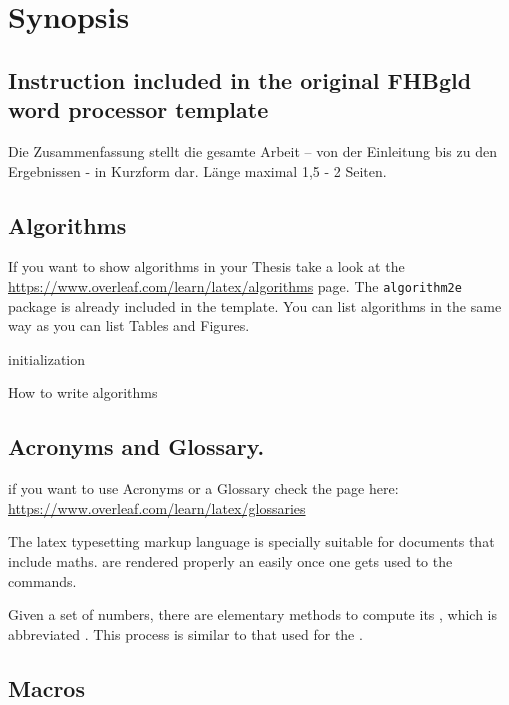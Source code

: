 \chapter{Synopsis}

\section{Instruction included in the original FHBgld word processor template}
Die Zusammenfassung stellt die gesamte Arbeit – von der Einleitung bis zu den Ergebnissen - in Kurzform dar. Länge maximal 1,5 - 2 Seiten. 

\section{Algorithms}

If you want to show algorithms in your Thesis take a look at the \url{https://www.overleaf.com/learn/latex/algorithms} page. The \verb|algorithm2e| package is already included in the template. You can list algorithms in the same way as you can list Tables and Figures.

\begin{algorithm}[H]
	initialization\;
	\caption{How to write algorithms}
\end{algorithm}

\section{Acronyms and Glossary.}

if you want to use Acronyms or a Glossary check the page here: \url{https://www.overleaf.com/learn/latex/glossaries}

The \Gls{latex} typesetting markup language is specially suitable 
for documents that include \gls{maths}. are 
rendered properly an easily once one gets used to the commands.

Given a set of numbers, there are elementary methods to compute 
its , which is abbreviated . This 
process is similar to that used for the .

\section{Macros}

